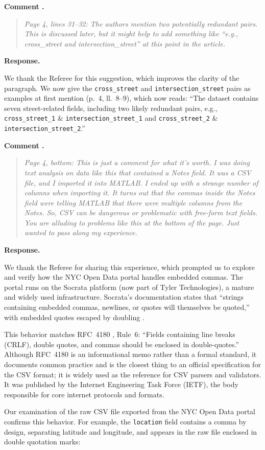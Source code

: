\documentclass[11pt]{article}
\newcounter{refcomment}
\newcommand{\refcomment}[1]{%
  \FloatBarrier
  \stepcounter{refcomment}%
  \par\medskip
  \noindent\textbf{Comment \therefcomment.}
  \begin{quote}\itshape #1\end{quote}
  \noindent\textbf{Response.}~}
\begin{document}
\refcomment{Page 4, lines 31--32: The authors mention two potentially
redundant pairs. This is discussed later, but it might help to add
something like ``e.g., cross\_street and intersection\_street'' at this
point in the article.}

We thank the Referee for this suggestion, which improves the clarity of
the paragraph. We now give the \texttt{cross\_street} and
\texttt{intersection\_street} pairs as examples at first mention
(p.~4, ll.~8--9), which now reads: ``The dataset contains seven
street-related fields, including two likely redundant pairs, e.g.,
\texttt{cross\_street\_1} \& \texttt{intersection\_\allowbreak street\_1}
and \texttt{cross\_street\_2} \& \texttt{intersection\_\allowbreak street\_2}.''

\refcomment{Page 4, bottom: This is just a comment for what it's worth.
I was doing text analysis on data like this that contained a Notes
field. It was a CSV file, and I imported it into MATLAB. I ended up
with a strange number of columns when importing it. It turns out that
the commas inside the Notes field were telling MATLAB that there were
multiple columns from the Notes. So, CSV can be dangerous or
problematic with free-form text fields. You are alluding to problems
like this at the bottom of the page. Just wanted to pass along my
experience.}

We thank the Referee for sharing this experience, which prompted us to
explore and verify how the NYC Open Data portal handles embedded commas. The
portal runs on the Socrata platform (now part of Tyler Technologies), a
mature and widely used infrastructure. Socrata's documentation states
that ``strings containing embedded commas, newlines, or quotes will
themselves be quoted,'' with embedded quotes escaped by doubling
\citep{socrata_csv}.

This behavior matches RFC~4180 \citep{rfc4180}, Rule~6: ``Fields
containing line breaks (CRLF), double quotes, and commas should be
enclosed in double-quotes.'' Although RFC~4180 is an informational memo
rather than a formal standard, it documents common practice and is the
closest thing to an official specification for the CSV format; it is
widely used as the reference for CSV parsers and validators. It was
published by the Internet Engineering Task Force (IETF), the body
responsible for core internet protocols and formats.

Our examination of the raw CSV file exported from the NYC Open Data
portal confirms this behavior. For example, the \texttt{location} field
contains a comma by design, separating latitude and longitude, and
appears in the raw file enclosed in double quotation marks:
\end{document}
